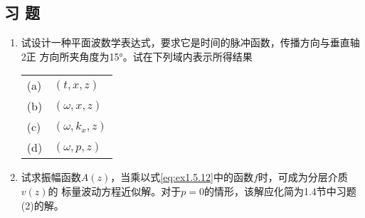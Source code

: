 \subsection{习 题}
\begin{enumerate}
\item 试设计一种平面波数学表达式，要求它是时间的脉冲函数，传播方向与垂直轴2正
方向所夹角度为15°。试在下列域内表示所得结果
\begin{table}[!ht]
\centering
\ttfamily
\small
\begin{tabular}{p{3cm}p{4cm}}
\toprule
\midrule
 (a)& $(t,x,z)$\\
 (b)&$(\omega,x,z)$ \\
 (c)&$(\omega,k_x,z)$\\
 (d)&$(\omega,p,z)$ 
\end{tabular}
\end{table}
\item 试求振幅函数$A(z)$，当乘以式\ref{eq:ex1.5.12}中的函数$f$时，可成为分层介质$v(z)$的
标量波动方程近似解。对于$p=0$的情形，该解应化简为1.4节中习题(2)的解。
\end{enumerate}

